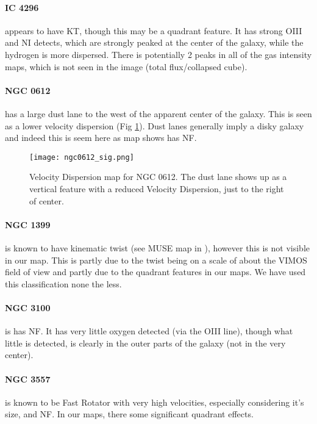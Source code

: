 \documentclass[a4paper,fleqn,usenatbib,useAMS]{mnras}
\begin{document}
	\paragraph{IC 4296} appears to have KT, though this may be a quadrant feature. It has strong OIII and NI detects, which are strongly peaked at the center of the galaxy, while the hydrogen is more dispersed. There is potentially 2 peaks in all of the gas intensity maps, which is not seen in the image (total flux/collapsed cube).

	\paragraph{NGC 0612} has a large dust lane to the west of the apparent center of the galaxy. This is seen as a lower velocity dispersion (Fig \ref{fig:ngc0612_sig}). Dust lanes generally imply a disky galaxy and indeed this is seem here as map shows has NF. 

	\begin{figure}[!ht]
		\centering
		\texttt{[image: ngc0612\_sig.png]}
		\caption{Velocity Dispersion map for NGC 0612. The dust lane shows up as a vertical feature with a reduced Velocity Dispersion, just to the right of center.}
		\label{fig:ngc0612_sig}
	\end{figure}

	\paragraph{NGC 1399} is known to have kinematic twist (see MUSE map in \citet{Zieleniewski2017}), however this is not visible in our map. This is partly due to the twist being on a scale of about the VIMOS field of view and partly due to the quadrant features in our maps. We have used this classification none the less. 

	\paragraph{NGC 3100} is has NF. It has very little oxygen detected (via the OIII line), though what little is detected, is clearly in the outer parts of the galaxy (not in the very center).

	\paragraph{NGC 3557} is known to be Fast Rotator with very high velocities, especially considering it's size, and NF. In our maps, there some significant quadrant effects.
\end{document}
